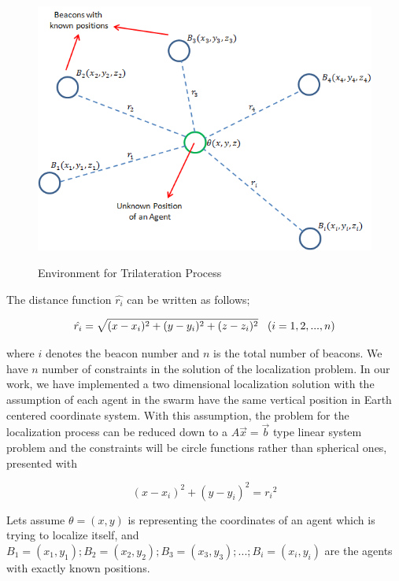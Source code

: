 \begin{figure}[H] 
\caption{Environment for Trilateration Process}
\centering
\includegraphics[scale = 0.65]{beacons}
\label{beacons_ref}
\end{figure}

The distance function $\hat{r_i}$ can be written as follows;

\begin{equation} %
\hat{r_i} = \sqrt{(x-x_i)^2 + (y-y_i)^2+ (z-z_i)^2}    \hspace{0.3cm}   (i=1,2,...,n)
\end{equation}

where $i$ denotes the beacon number and $n$ is the total number of beacons. We have $n$ number of constraints in the solution of the localization problem. In our work, we have implemented a two dimensional localization solution with the assumption of each agent in the swarm have the same vertical position in Earth centered coordinate system. With this assumption, the problem for the localization process can be reduced down to a $A\vec{x} =\vec{b} $ type linear system problem and the constraints will be circle functions rather than spherical ones, presented with

\begin{equation}
(x-x_i)^2 + (y - y_i)^2 = {r_i}^2
\end{equation}

Lets assume $\theta = (x,y)$ is representing the coordinates of an agent which is trying to localize itself, and $B_1 = (x_1,y_1) ; B_2 = (x_2,y_2) ; B_3 = (x_3,y_3) ; ...  ; B_i = (x_i,y_i)$ are the agents with exactly known positions.

